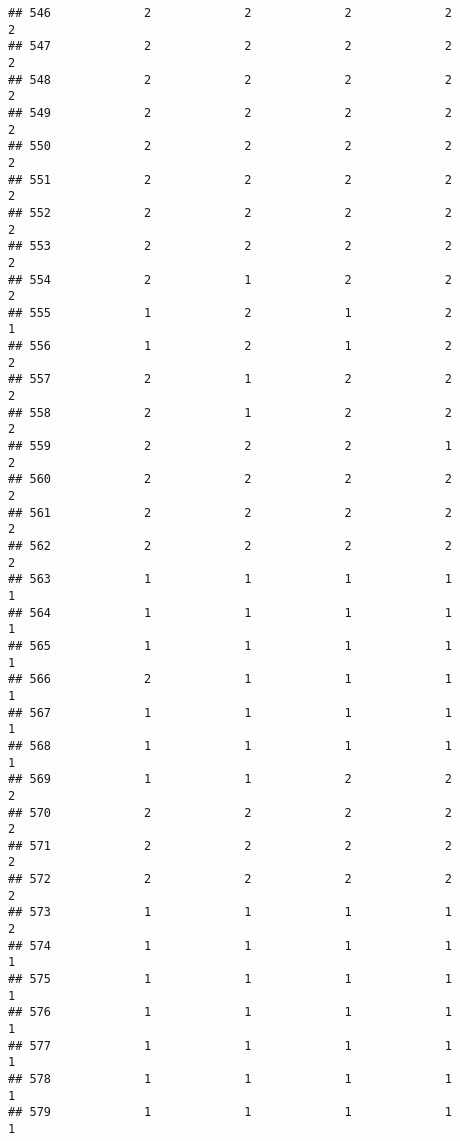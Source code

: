 \documentclass[
]{article}
\begin{document}
\begin{verbatim}
## 546             2             2             2             2             2
## 547             2             2             2             2             2
## 548             2             2             2             2             2
## 549             2             2             2             2             2
## 550             2             2             2             2             2
## 551             2             2             2             2             2
## 552             2             2             2             2             2
## 553             2             2             2             2             2
## 554             2             1             2             2             2
## 555             1             2             1             2             1
## 556             1             2             1             2             2
## 557             2             1             2             2             2
## 558             2             1             2             2             2
## 559             2             2             2             1             2
## 560             2             2             2             2             2
## 561             2             2             2             2             2
## 562             2             2             2             2             2
## 563             1             1             1             1             1
## 564             1             1             1             1             1
## 565             1             1             1             1             1
## 566             2             1             1             1             1
## 567             1             1             1             1             1
## 568             1             1             1             1             1
## 569             1             1             2             2             2
## 570             2             2             2             2             2
## 571             2             2             2             2             2
## 572             2             2             2             2             2
## 573             1             1             1             1             2
## 574             1             1             1             1             1
## 575             1             1             1             1             1
## 576             1             1             1             1             1
## 577             1             1             1             1             1
## 578             1             1             1             1             1
## 579             1             1             1             1             1

\end{verbatim}
\end{document}
